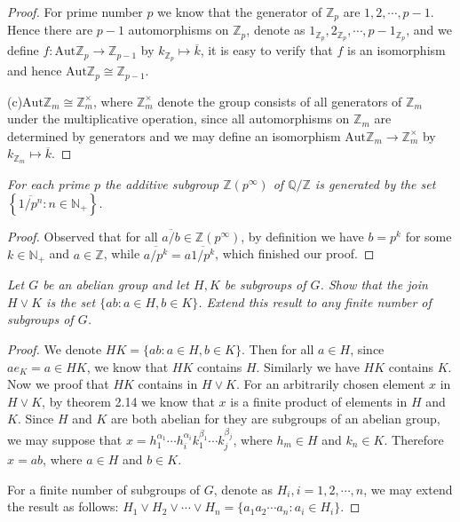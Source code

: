 \begin{proof}
For prime number $p$ we know that the generator of $\mathbb{Z}_p$ are $1,2,\cdots,p-1$. Hence there are $p-1$ automorphisms on $\mathbb{Z}_p$, denote as $1_{\mathbb{Z}_p},2_{\mathbb{Z}_p},\cdots,p-1_{\mathbb{Z}_p}$, and we define $f:\mathrm{Aut}\mathbb{Z}_p\to\mathbb{Z}_{p-1}$ by $k_{\mathbb{Z}_p}\mapsto\overline{k}$, it is easy to verify that $f$ is an isomorphism and hence $\mathrm{Aut}\mathbb{Z}_p\cong\mathbb{Z}_{p-1}$.\par
(c)$\mathrm{Aut}\mathbb{Z}_m\cong\mathbb{Z}_m^\times$, where $\mathbb{Z}_m^\times$ denote the group consists of all generators of $\mathbb{Z}_m$ under the multiplicative operation, since all automorphisms on $\mathbb{Z}_m$ are determined by generators and we may define an isomorphism $\mathrm{Aut}\mathbb{Z}_m\to\mathbb{Z}_m^\times$ by $k_{\mathbb{Z}_m}\mapsto\overline{k}$. 
\end{proof}
\begin{problem}\em
For each prime $p$ the additive subgroup $\mathbb{Z}(p^\infty)$ of $\mathbb{Q}/\mathbb{Z}$ is generated by the set $\left\{ \overline{{{1}/{p^n}}}:n\in \mathbb{N} _+ \right\} $.
\end{problem}
\begin{proof}
Observed that for all $\overline{a/b}\in\mathbb{Z}(p^\infty)$, by definition we have $b=p^k$ for some $k\in\mathbb{N}_+$ and $a\in\mathbb{Z}$, while $\overline{a/p^k}=a\overline{1/p^k}$, which finished our proof.
\end{proof}
\begin{problem}\em
Let $G$ be an abelian group and let $H,K$ be subgroups of $G$. Show that the join $H\vee K$ is the set $\{ab:a\in H,b\in K\}$. Extend this result to any finite number of subgroups of $G$.
\end{problem}
\begin{proof}
We denote $HK=\{ab:a\in H,b\in K\}$. Then for all $a\in H$, since $ae_K=a\in HK$, we know that $HK$ contains $H$. Similarly we have $HK$ contains $K$. Now we proof that $HK$ contains in $H\vee K$. For an arbitrarily chosen element $x$ in $H\vee K$, by theorem 2.14 we know that $x$ is a finite product of elements in $H$ and $K$. Since $H$ and $K$ are both abelian for they are subgroups of an abelian group, we may suppose that $x=h_1^{\alpha_1}\cdots h_i^{\alpha_i}k_1^{\beta_1}\cdots k_j^{\beta_j}$, where $h_m\in H$ and $k_n\in K$. Therefore $x=ab$, where $a\in H$ and $b\in K$.\par
For a finite number of subgroups of $G$, denote as $H_i,i=1,2,\cdots,n$, we may extend the result as follows: $H_1\vee H_2\vee\cdots\vee H_n=\{a_1a_2\cdots a_n:a_i\in H_i\}$.
\end{proof}
